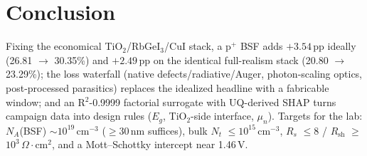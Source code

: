\documentclass[review]{elsarticle}
\begin{document}
\section{Conclusion}
Fixing the economical TiO$_{2}$/RbGeI$_{3}$/CuI stack, a p$^{+}$ BSF adds $+3.54$\,pp ideally (26.81 $\rightarrow$ 30.35\%) and $+2.49$\,pp on the identical full-realism stack (20.80 $\rightarrow$ 23.29\%); the loss waterfall (native defects/radiative/Auger, photon-scaling optics, post-processed parasitics) replaces the idealized headline with a fabricable window; and an R$^{2}$-0.9999 factorial surrogate with UQ-derived SHAP turns campaign data into design rules ($E_{g}$, TiO$_{2}$-side interface, $\mu_{n}$). Targets for the lab: $N_{A}$(BSF) $\sim$$10^{19}$\,cm$^{-3}$ ($\ge$30\,nm suffices), bulk $N_{t}$ $\le$$10^{15}$\,cm$^{-3}$, $R_{s}$ $\le$8 / $R_{\mathrm{sh}}$ $\ge$$10^{3}$\,$\Omega\cdot$cm$^{2}$, and a Mott--Schottky intercept near 1.46\,V.
\end{document}
